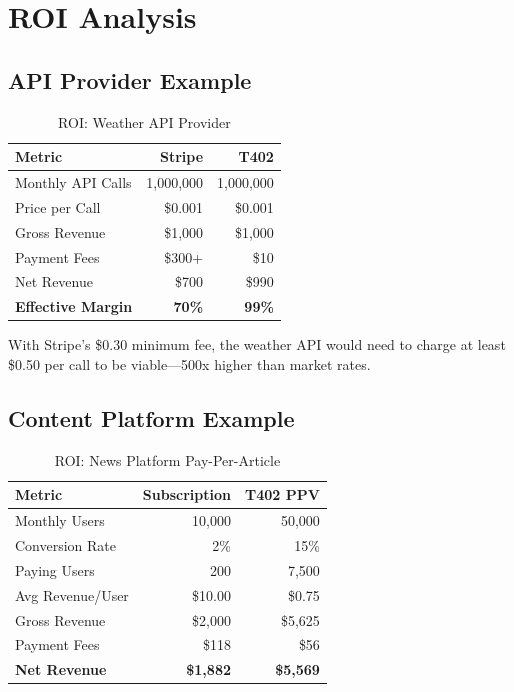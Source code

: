 \section{ROI Analysis}
\label{sec:roi-analysis}

\subsection{API Provider Example}

\begin{table}[htbp]
\centering
\caption{ROI: Weather API Provider}
\label{tab:roi-weather}
\begin{tabular}{l r r}
\toprule
\textbf{Metric} & \textbf{Stripe} & \textbf{T402} \\
\midrule
Monthly API Calls & 1,000,000 & 1,000,000 \\
Price per Call & \$0.001 & \$0.001 \\
Gross Revenue & \$1,000 & \$1,000 \\
Payment Fees & \$300+ & \$10 \\
Net Revenue & \$700 & \$990 \\
\textbf{Effective Margin} & \textbf{70\%} & \textbf{99\%} \\
\bottomrule
\end{tabular}
\end{table}

\begin{warningbox}
With Stripe's \$0.30 minimum fee, the weather API would need to charge at least \$0.50 per call to be viable---500x higher than market rates.
\end{warningbox}

\subsection{Content Platform Example}

\begin{table}[htbp]
\centering
\caption{ROI: News Platform Pay-Per-Article}
\label{tab:roi-news}
\begin{tabular}{l r r}
\toprule
\textbf{Metric} & \textbf{Subscription} & \textbf{T402 PPV} \\
\midrule
Monthly Users & 10,000 & 50,000 \\
Conversion Rate & 2\% & 15\% \\
Paying Users & 200 & 7,500 \\
Avg Revenue/User & \$10.00 & \$0.75 \\
Gross Revenue & \$2,000 & \$5,625 \\
Payment Fees & \$118 & \$56 \\
\textbf{Net Revenue} & \textbf{\$1,882} & \textbf{\$5,569} \\
\bottomrule
\end{tabular}
\end{table}

